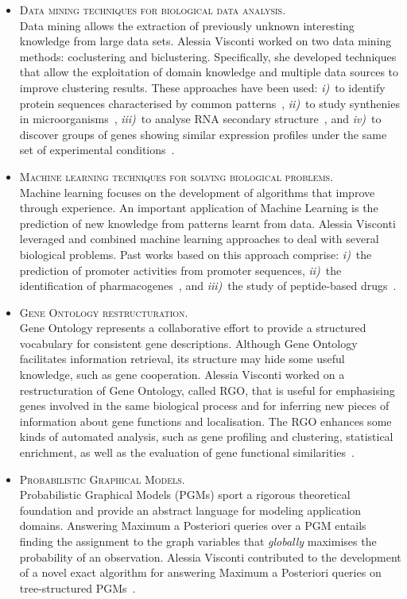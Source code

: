 \documentclass[a4paper,10pt]{article}
\newcommand{\smalltitle}[1]{
	\vspace{0.1cm}
	{\noindent 
	\large \textsc{#1}}
	\vspace{0.1cm}
}
\newcommand{\bulletitem}{\item[$\bullet$]}
\begin{document}
\begin{itemize}
\bulletitem \smalltitle{Data mining techniques for biological data analysis.}\\
Data mining allows the extraction of previously unknown interesting knowledge from large data sets.
Alessia Visconti worked on two data mining methods: coclustering and biclustering. Specifically, she developed techniques that allow the exploitation of domain knowledge and multiple data sources to improve clustering results.
These approaches have been used: \emph{i)}~to identify protein sequences characterised by common patterns~\cite{Vis08, Cor09a, Cor08b}, \emph{ii)}~to study synthenies in microorganisms~\cite{Bon11}, \emph{iii)}~to analyse RNA secondary structure~\cite{Cor08a}, and \emph{iv)}~to discover groups of genes showing similar expression profiles under the same set of experimental conditions~\cite{Vis13a, Cor09b, Vis11c, Vis12b}.

\bulletitem \smalltitle{Machine learning techniques for solving biological problems.}\\
Machine learning focuses on the development of algorithms that improve through experience. An important application of Machine Learning  is the prediction of new knowledge from patterns learnt from data. 
Alessia Visconti leveraged and combined machine learning approaches to deal with several biological problems. Past works based on this approach comprise: \emph{i)}~the prediction of promoter activities from promoter sequences, \emph{ii)}~the identification of pharmacogenes~\cite{Vis12a, Vis12b}, and \emph{iii)}~the study of peptide-based drugs~\cite{Erm14, Vis15a, Erm13a}.

\bulletitem \smalltitle{Gene Ontology restructuration.} \\
Gene Ontology represents a collaborative effort to provide a structured vocabulary for consistent gene descriptions. Although Gene Ontology facilitates information retrieval, its structure may hide some useful knowledge, such as gene cooperation.
Alessia Visconti worked on a restructuration of Gene Ontology, called RGO, that is useful for emphasising genes involved in the same biological process and for inferring new pieces of information about gene functions and localisation. The RGO enhances some kinds of automated analysis, such as gene profiling and clustering, statistical enrichment, as well as the evaluation of gene functional similarities~\cite{Vis11a, Vis10a, Vis12b}.

\bulletitem \smalltitle{Probabilistic Graphical Models.}\\
Probabilistic Graphical Models (PGMs) sport a rigorous theoretical foundation and provide an abstract language for modeling application domains. Answering Maximum a Posteriori queries over a PGM entails finding the assignment to the graph variables that \emph{globally} maximises the probability of an observation. 
Alessia Visconti contributed to the development of a novel exact algorithm for answering Maximum a Posteriori queries on tree-structured PGMs~\cite{Esp13}.

\end{itemize}
\end{document}
